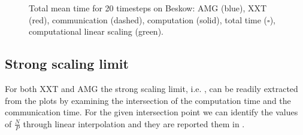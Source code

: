 \documentclass{sig-alternate}
\begin{document}
\begin{figure}
{  }
\caption{Total mean time for 20 timesteps on Beskow: AMG ({\color{blue}blue}), XXT ({\color{red}red}), communication (dashed),
  computation (solid),  total time ($\square$), computational linear scaling
  ({\color{green}green}).}
\label{fig:scaling_beskow}
\end{figure}



\subsection{Strong scaling limit}

For both XXT and AMG the strong scaling limit, i.e. , can be readily extracted from the plots by examining the intersection of the computation time 
and the communication time. For the given intersection point we can identify the values of $\frac{N}{P}$ through linear interpolation and they are reported them in .
\end{document}
